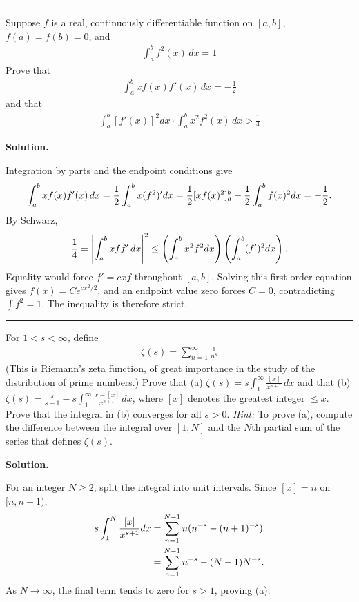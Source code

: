 \documentclass[12pt]{article}
\theoremstyle{definition}
\begin{document}
\bigskip\noindent\hrule\bigskip

Suppose $f$ is a real, continuously differentiable function on $[a,b]$, $f(a)=f(b)=0$, and
\begin{align*}
\int_a^bf^2(x)\,dx=1
\end{align*}
Prove that
\begin{align*}
\int_a^bxf(x)f'(x)\,dx=-\frac{1}{2}
\end{align*}
and that
\begin{align*}
\int_a^b\left[f'(x)\right]^2dx\cdot\int_a^bx^2f^2(x)\,dx>\frac{1}{4}
\end{align*}

\smallskip
\noindent\textbf{Solution.}\quad


Integration by parts and the endpoint conditions give
\[
 \int_a^bxf(x)f'(x)\,dx
 ={1\over2}\int_a^bx(f^2)'dx
 ={1\over2}[xf(x)^2]_a^b-{1\over2}\int_a^bf(x)^2dx=-\frac12.
\]
By Schwarz,
\[
 {1\over4}=\left|\int_a^bxf f'\,dx\right|^2
 \le\left(\int_a^bx^2f^2dx\right)\left(\int_a^b(f')^2dx\right).
\]
Equality would force $f'=cxf$ throughout $[a,b]$.  Solving this first-order equation gives $f(x)=C e^{cx^2/2}$, and an endpoint value zero forces $C=0$, contradicting $\int f^2=1$.  The inequality is therefore strict.




\bigskip\noindent\hrule\bigskip

For $1<s<\infty$, define
\begin{align*}
\zeta(s)=\sum_{n=1}^\infty\frac{1}{n^s}
\end{align*}
(This is Riemann's zeta function, of great importance in the study of the distribution of prime numbers.) Prove that
(a) $\zeta(s)=s\int_1^\infty\frac{[x]}{x^{s+1}}\,dx$
and that
(b) $\zeta(s)=\frac{s}{s-1}-s\int_1^\infty\frac{x-[x]}{x^{s+1}}\,dx$,
where $[x]$ denotes the greatest integer $\le x$.
Prove that the integral in (b) converges for all $s>0$.
\textit{Hint:} To prove (a), compute the difference between the integral over $[1,N]$ and the $N$th partial sum of the series that defines $\zeta(s)$.

\smallskip
\noindent\textbf{Solution.}\quad


For an integer $N\ge2$, split the integral into unit intervals.  Since $[x]=n$ on $[n,n+1)$,
\begin{align*}
 s\int_1^N{[x]\over x^{s+1}}dx
 &=\sum_{n=1}^{N-1}n(n^{-s}-(n+1)^{-s})\\
 &=\sum_{n=1}^{N-1}n^{-s}-(N-1)N^{-s}.
\end{align*}
As $N\to\infty$, the final term tends to zero for $s>1$, proving (a).
\end{document}
